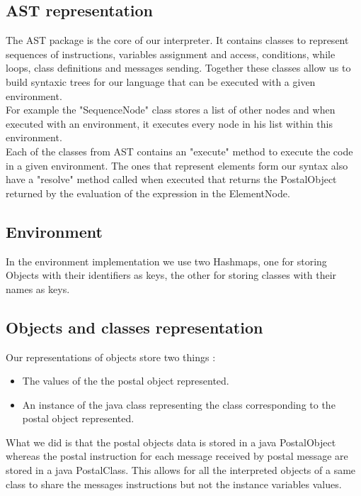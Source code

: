 \documentclass{eplDoc}
\begin{document}
\subsection{AST representation}
The AST package is the core of our interpreter. It contains classes to represent sequences of instructions, variables assignment and access, conditions, while loops, class definitions and messages sending. Together these classes allow us to build syntaxic trees for our language that can be executed with a given environment. \\ 
For example the "SequenceNode" class stores a list of other nodes and when executed with an environment, it executes every node in his list within this environment. \\ 
Each of the classes from AST contains an "execute" method to execute the code in a given environment. The ones that represent elements form our syntax also have a "resolve" method called when executed that returns the PostalObject returned by the evaluation of the expression in the ElementNode. 

\subsection{Environment}

In the environment implementation we use two Hashmaps, one for storing Objects with their identifiers as keys, the other for storing classes with their names as keys. \\ 


\subsection{Objects and classes representation}

Our representations of objects store two things : 
\begin{itemize}
	\item The values of the the postal object represented.
	\item An instance of the java class representing the class corresponding to the postal object represented.
\end{itemize}
What we did is that the postal objects data is stored in a java PostalObject whereas the postal instruction for each message received by postal message are stored in a java PostalClass. This allows for all the interpreted objects of a same class to share the messages instructions but not the instance variables values. 
\end{document}
